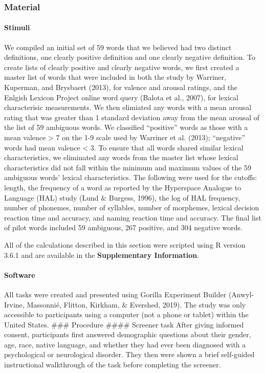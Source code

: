 \documentclass[man]{apa6}
\let\oldparagraph\paragraph
\renewcommand{\paragraph}[1]{\oldparagraph{#1}\mbox{}}
\begin{document}
\hypertarget{material}{%
\subsubsection{Material}\label{material}}

\hypertarget{stimuli}{%
\paragraph{Stimuli}\label{stimuli}}

We compiled an initial set of 59 words that we believed had two distinct definitions, one clearly positive definition and one clearly negative definition. To create lists of clearly positive and clearly negative words, we first created a master list of words that were included in both the study by Warriner, Kuperman, and Brysbaert (2013), for valence and arousal ratings, and the Enlgish Lexicon Project online word query (Balota et al., 2007), for lexical characterisic measurements. We then elimiated any words with a mean arousal rating that was greater than 1 standard deviation away from the mean arousal of the list of 59 ambiguous words. We classified \enquote{positive} words as those with a mean valence \textgreater{} 7 on the 1-9 scale used by Warriner et al. (2013); \enquote{negative} words had mean valence \textless{} 3. To ensure that all words shared similar lexical characteristics, we eliminated any words from the master list whose lexical characteristics did not fall within the minimum and maximum values of the 59 ambiguous words' lexical characteristics. The following were used for the cutoffs: length, the frequency of a word as reported by the Hyperspace Analogue to Language (HAL) study (Lund \& Burgess, 1996), the log of HAL frequency, number of phonemes, number of syllables, number of morphemes, lexical decision reaction time and accuracy, and naming reaction time and accuracy. The final list of pilot words included 59 ambiguous, 267 positive, and 304 negative words.

All of the calculations described in this section were scripted using R version 3.6.1 and are available in the \textbf{Supplementary Information}.

\hypertarget{software}{%
\paragraph{Software}\label{software}}

All tasks were created and presented using Gorilla Experiment Builder (Anwyl-Irvine, Massonnié, Flitton, Kirkham, \& Evershed, 2019). The study was only accessible to participants using a computer (not a phone or tablet) within the United States.
\#\#\# Procedure
\#\#\#\# Screener task
After giving informed consent, participants first answered demographic questions about their gender, age, race, native language, and whether they had ever been diagnosed with a psychological or neurological disorder. They then were shown a brief self-guided instructional walkthrough of the task before completing the screener.
\end{document}
